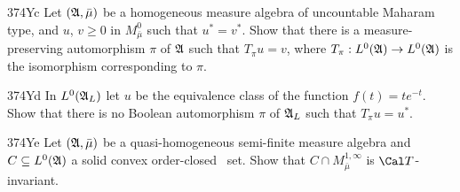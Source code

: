 {\spheader 374Yc Let $(\frak A,\bar\mu)$ be a homogeneous measure
algebra of uncountable Maharam type, and $u$, $v\ge 0$ in
$M^0_{\bar\mu}$ such that $u^*=v^*$.   Show that there
is a measure-preserving automorphism $\pi$ of $\frak A$ such that
$T_{\pi}u=v$, where $T_{\pi}:L^0(\frak A)\to L^0(\frak A)$ is the
isomorphism corresponding to $\pi$.

\spheader 374Yd In $L^0(\frak A_L)$ let $u$ be the equivalence class of
the function $f(t)=te^{-t}$.   Show that there is no Boolean
automorphism $\pi$ of $\frak A_L$ such that $T_{\pi}u=u^*$.   

\spheader 374Ye Let $(\frak A,\bar\mu)$ be a quasi-homogeneous
semi-finite measure algebra and $C\subseteq L^0(\frak A)$ a solid convex
order-closed \ri\ set.   Show that $C\cap M^{1,\infty}_{\bar\mu}$ is
$\Cal T$-invariant.

}%


